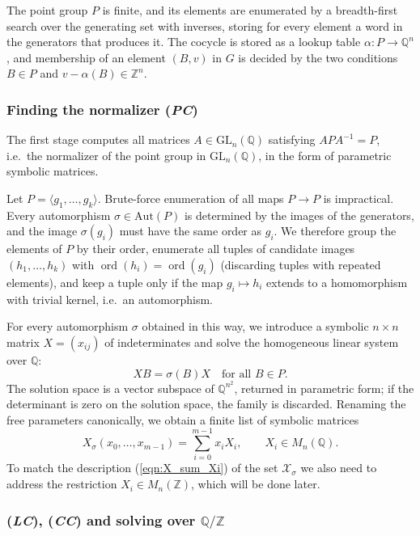 \documentclass[draft]{adm-paper}
\theoremstyle{definition}
\begin{document}
The point group $P$ is finite, and its elements are enumerated by a
breadth-first search over the generating set with inverses, storing for every
element a word in the generators that produces it. The cocycle is stored as a lookup
table $\alpha : P \to \mathbb{Q}^n$, and membership of an element $(B,v)$ in $G$
is decided by the two conditions $B \in P$ and $v - \alpha(B) \in \mathbb{Z}^n$.

\subsubsection*{Finding the normalizer (\textit{PC})}

The first stage computes all matrices $A \in \mathrm{GL}_n(\mathbb{Q})$ satisfying
$APA^{-1} = P$, i.e.\ the normalizer of the point group in $\mathrm{GL}_n(\mathbb{Q})$,
in the form of parametric symbolic matrices.

Let $P = \langle g_1, \dots, g_k \rangle$. Brute-force enumeration of all maps $P \rightarrow P$ is impractical.
Every automorphism $\sigma \in \mathrm{Aut}(P)$ is determined by the images of the generators, and
the image $\sigma(g_i)$ must have the same order as $g_i$. We therefore group
the elements of $P$ by their order, enumerate all tuples of candidate images
$(h_1, \dots, h_k)$ with $\operatorname{ord}(h_i) = \operatorname{ord}(g_i)$
(discarding tuples with repeated elements), and keep a tuple only if the map
$g_i \mapsto h_i$ extends to a homomorphism with trivial kernel, i.e.\ an
automorphism.

For every automorphism $\sigma$ obtained in this way, we introduce a symbolic
$n \times n$ matrix $X = (x_{ij})$ of indeterminates and solve the homogeneous
linear system over $\mathbb{Q}$:
\[
  X B = \sigma(B) X \quad \text{for all } B \in P.
\]
The solution space is a vector subspace of $\mathbb{Q}^{n^2}$, returned in
parametric form; if the determinant is zero on the solution space, the family is discarded.
Renaming the free parameters canonically, we obtain a finite list of symbolic
matrices
\[
  X_\sigma(x_0, \dots, x_{m-1}) = \sum_{i=0}^{m-1} x_i X_i,
  \qquad X_i \in M_n(\mathbb{Q}).
\]
To match the description (\ref{eqn:X_sum_Xi}) of the set $\mathcal{X}_\sigma$ we also need to address the restriction
$X_i \in M_n(\mathbb{Z})$, which will be done later.

\subsubsection*{(\textit{LC}), (\textit{CC}) and solving over $\mathbb{Q}/\mathbb{Z}$}
\end{document}
